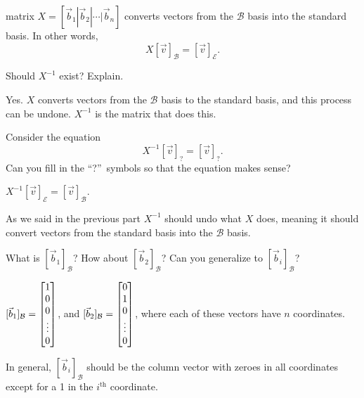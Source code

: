 \documentclass{problemset}
\begin{document}
	matrix $X=[\vec b_1|\vec b_2|\cdots|\vec b_n]$ converts
	vectors from the $\mathcal B$ basis into the standard basis. In other words,
	\[
		X[\vec v]_{\mathcal B} = [\vec v]_{\mathcal E}.
	\]
	\begin{parts}
		\item Should $X^{-1}$ exist? Explain.
			\begin{solution}
				Yes. $X$ converts vectors from the
				$\mathcal B$ basis to the standard basis, and this process can be undone.
				$X^{-1}$ is the matrix that does this.
			\end{solution}
		\item Consider the equation
			\[
				X^{-1}[\vec v]_{?} = [\vec v]_{?}.
			\]
			Can you fill in the ``?''~symbols so that the equation makes sense?
			\begin{solution}
				$X^{-1}[\vec v]_{\mathcal E} = [\vec v]_{\mathcal B}$.

				As we said in the previous part $X^{-1}$ should undo what $X$ does,
				meaning it should convert vectors from the standard basis into
				the $\mathcal B$ basis.
			\end{solution}
		\item What is $[\vec b_1]_{\mathcal B}$?  How about $[\vec b_2]_{\mathcal B}$?  Can
			you generalize to $[\vec b_i]_{\mathcal B}$?
			\begin{solution}
				$[\vec b_1]_{\mathcal B}=\begin{bmatrix}1\\0\\0\\\vdots\\0\end{bmatrix}$, and
				$[\vec b_2]_{\mathcal B}=\begin{bmatrix}0\\1\\0\\\vdots\\0\end{bmatrix}$, where each of
				these vectors have $n$ coordinates.

				In general, $[\vec b_i]_{\mathcal B}$ should be the column vector
				with zeroes in all coordinates except for a 1 in the $i^\text{th}$
				coordinate.
			\end{solution}
	\end{parts}
\end{document}
